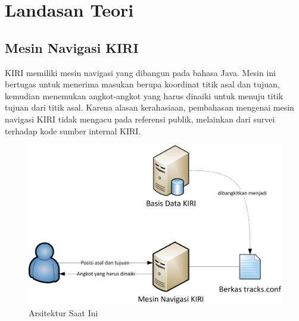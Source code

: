 \chapter{Landasan Teori}
\label{chap:pendahuluan}

\section{Mesin Navigasi KIRI}
\label{sec:mesin_navigasi_kiri}

KIRI memiliki mesin navigasi yang dibangun pada bahasa Java. Mesin ini bertugas
untuk menerima masukan berupa koordinat titik asal dan tujuan, kemudian
menemukan angkot-angkot yang harus dinaiki untuk menuju titik tujuan dari
titik asal. Karena alasan kerahasiaan, pembahasan mengenai mesin navigasi
KIRI tidak mengacu pada referensi publik, melainkan dari survei terhadap
kode sumber internal KIRI.

\begin{figure}
\centering
\includegraphics[scale=1]{Gambar/2_arsitektur_saat_ini}
\caption{Arsitektur Saat Ini} 
\label{fig:2_arsitektur_saat_ini}
\end{figure}

